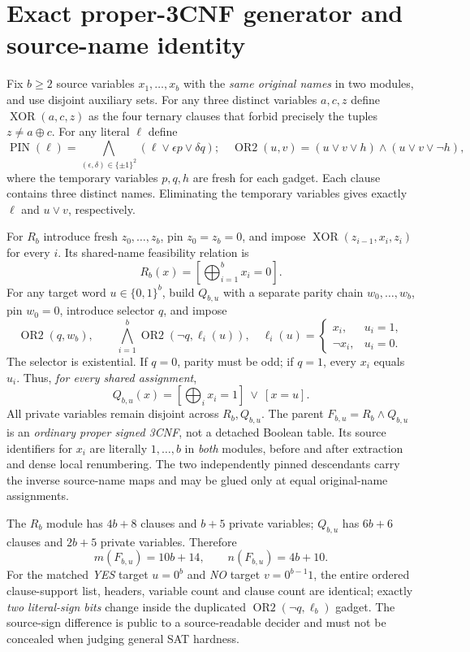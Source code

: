 \documentclass[11pt]{article}
\begin{document}
\section{Exact proper-3CNF generator and source-name identity}
Fix $b\ge2$ source variables $x_1,\ldots,x_b$ with the \emph{same original
names} in two modules, and use disjoint auxiliary sets. For any three
distinct variables $a,c,z$ define $\operatorname{XOR}(a,c,z)$ as the four
ternary clauses that forbid precisely the tuples $z\ne a\oplus c$.
For any literal $\ell$ define
\[
 \operatorname{PIN}(\ell)
 =\!\!\bigwedge_{(\epsilon,\delta)\in\{\pm1\}^2}
    (\ell\vee \epsilon p\vee\delta q);
 \quad
 \operatorname{OR2}(u,v)
 =(u\vee v\vee h)\wedge(u\vee v\vee\neg h),
\]
where the temporary variables $p,q,h$ are fresh for each gadget. Each
clause contains three distinct names. Eliminating the temporary variables
gives exactly $\ell$ and $u\vee v$, respectively.

For $R_b$ introduce fresh $z_0,\ldots,z_b$, pin $z_0=z_b=0$, and impose
$\operatorname{XOR}(z_{i-1},x_i,z_i)$ for every $i$. Its shared-name feasibility
relation is
\[
 R_b(x)=[\bigoplus_{i=1}^b x_i=0].
\]
For any target word $u\in\{0,1\}^b$, build $Q_{b,u}$ with a separate
parity chain $w_0,\ldots,w_b$, pin $w_0=0$, introduce selector $q$, and
impose
\[
 \operatorname{OR2}(q,w_b),\qquad
 \bigwedge_{i=1}^b \operatorname{OR2}(\neg q,\ell_i(u)),
 \quad \ell_i(u)=
 \begin{cases}x_i,&u_i=1,\\\neg x_i,&u_i=0.\end{cases}
\]
The selector is existential. If $q=0$, parity must be odd; if $q=1$,
every $x_i$ equals $u_i$. Thus, \emph{for every shared assignment},
\[
 Q_{b,u}(x)=[\bigoplus_i x_i=1]\ \vee\ [x=u].
 \tag{1}
\]
All private variables remain disjoint across $R_b,Q_{b,u}$. The parent
$F_{b,u}=R_b\wedge Q_{b,u}$ is an \emph{ordinary proper signed 3CNF},
not a detached Boolean table. Its source identifiers for $x_i$ are
literally $1,\ldots,b$ in \emph{both} modules, before and after extraction
and dense local renumbering. The two independently pinned descendants
carry the inverse source-name maps and may be glued only at equal
original-name assignments.

The $R_b$ module has $4b+8$ clauses and $b+5$ private variables;
$Q_{b,u}$ has $6b+6$ clauses and $2b+5$ private variables. Therefore
\[
 m(F_{b,u})=10b+14,\qquad n(F_{b,u})=4b+10.
 \tag{2}
\]
For the matched \emph{YES} target $u=0^b$ and \emph{NO} target
$v=0^{b-1}1$, the entire ordered clause-support list, headers, variable
count and clause count are identical; exactly \emph{two literal-sign bits}
change inside the duplicated $\operatorname{OR2}(\neg q,\ell_b)$ gadget.
The source-sign difference is public to a source-readable decider and
must not be concealed when judging general SAT hardness.
\end{document}
